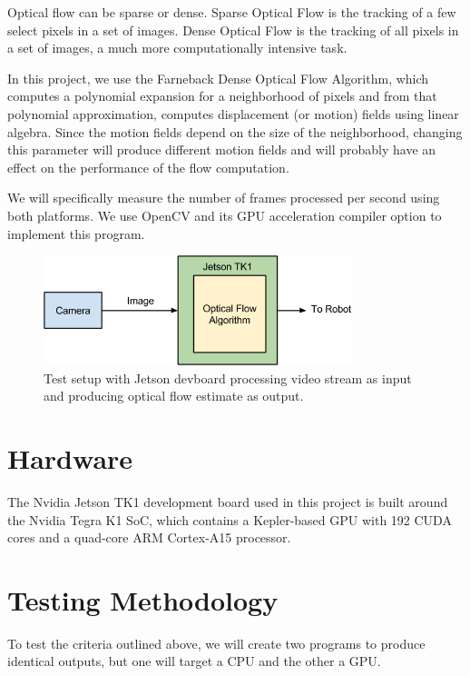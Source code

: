 \documentclass[12pt,letterpaper]{article}
\begin{document}
Optical flow can be sparse or dense. Sparse Optical Flow is the tracking of
a few select pixels in a set of images. Dense Optical Flow is the tracking of
all pixels in a set of images, a much more computationally intensive task.

In this project, we use the Farneback Dense Optical Flow Algorithm, which
computes a polynomial expansion for a neighborhood of pixels and from that
polynomial approximation, computes displacement (or motion) fields using linear
algebra. Since the motion fields depend on the size of the neighborhood,
changing this parameter will produce different motion fields and will probably
have an effect on the performance of the flow computation.

We will specifically measure the number of frames processed per second using
both platforms. We use OpenCV and its GPU acceleration compiler option to 
implement this program.

\begin{figure}[H]
  \centering
  \includegraphics[width=0.8\textwidth]{sys.png}
  \caption{Test setup with Jetson devboard processing video stream as input and producing optical flow estimate as output.}
\end{figure}

\section{Hardware}
The Nvidia Jetson TK1 development board used in this project is built around
the Nvidia Tegra K1 SoC, which contains a Kepler-based GPU with 192 CUDA cores
and a quad-core ARM Cortex-A15 processor.

\section{Testing Methodology}
To test the criteria outlined above, we will create two programs to produce
identical outputs, but one will target a CPU and the other a GPU.
\end{document}
